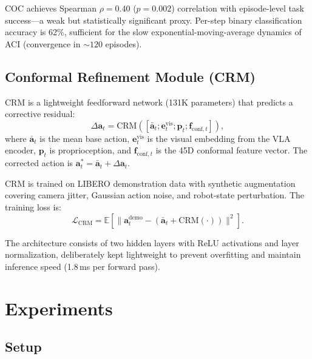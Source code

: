 \documentclass[10pt,twocolumn]{article}
\begin{document}
COC achieves Spearman $\rho{=}0.40$ ($p{=}0.002$) correlation with episode-level task success---a weak but statistically significant proxy.
Per-step binary classification accuracy is 62\%, sufficient for the slow exponential-moving-average dynamics of ACI (convergence in ${\sim}120$ episodes).

\subsection{Conformal Refinement Module (CRM)}
\label{sec:crm}

CRM is a lightweight feedforward network (131K parameters) that predicts a corrective residual:
\begin{equation}
\Delta\mathbf{a}_t = \mathrm{CRM}([\bar{\mathbf{a}}_t; \mathbf{e}_t^{\mathrm{vis}}; \mathbf{p}_t; \mathbf{f}_{\mathrm{conf},t}]),
\end{equation}
where $\bar{\mathbf{a}}_t$ is the mean base action, $\mathbf{e}_t^{\mathrm{vis}}$ is the visual embedding from the VLA encoder, $\mathbf{p}_t$ is proprioception, and $\mathbf{f}_{\mathrm{conf},t}$ is the 45D conformal feature vector.
The corrected action is $\mathbf{a}_t^* = \bar{\mathbf{a}}_t + \Delta\mathbf{a}_t$.

CRM is trained on LIBERO demonstration data with synthetic augmentation covering camera jitter, Gaussian action noise, and robot-state perturbation. The training loss is:
\begin{equation}
\mathcal{L}_{\mathrm{CRM}} = \mathbb{E}\left[\|\mathbf{a}_t^{\mathrm{demo}} - (\bar{\mathbf{a}}_t + \mathrm{CRM}(\cdot))\|^2\right].
\end{equation}

The architecture consists of two hidden layers with ReLU activations and layer normalization, deliberately kept lightweight to prevent overfitting and maintain inference speed (1.8\,ms per forward pass).

\section{Experiments}
\label{sec:experiments}

\subsection{Setup}
\end{document}
